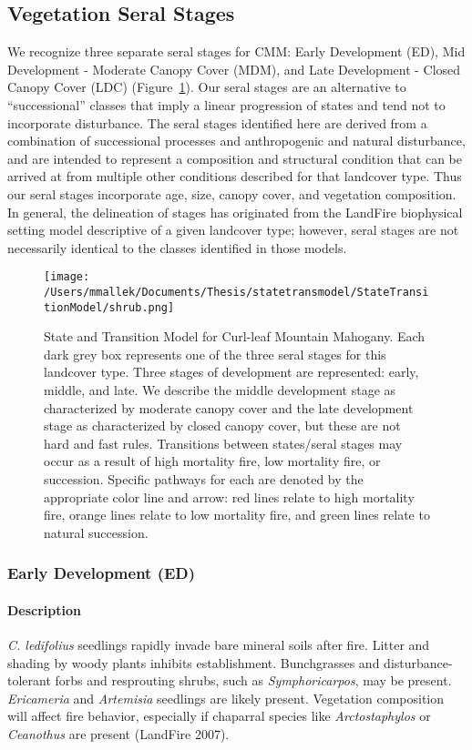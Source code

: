 \subsection*{Vegetation Seral Stages}
We recognize three separate seral stages for CMM: Early Development (ED), Mid Development - Moderate Canopy Cover (MDM), and Late Development - Closed Canopy Cover (LDC) (Figure~\ref{cmm_transmodel}). Our seral stages are an alternative to ``successional'' classes that imply a linear progression of states and tend not to incorporate disturbance. The seral stages identified here are derived from a combination of successional processes and anthropogenic and natural disturbance, and are intended to represent a composition and structural condition that can be arrived at from multiple other conditions described for that landcover type. Thus our seral stages incorporate age, size, canopy cover, and vegetation composition. In general, the delineation of stages has originated from the LandFire biophysical setting model descriptive of a given landcover type; however, seral stages are not necessarily identical to the classes identified in those models.

\begin{figure}[hbt]
\centering
\texttt{[image: /Users/mmallek/Documents/Thesis/statetransmodel/StateTransitionModel/shrub.png]}
\caption{State and Transition Model for Curl-leaf Mountain Mahogany. Each dark grey box represents one of the three seral stages for this landcover type. Three stages of development are represented: early, middle, and late. We describe the middle development stage as characterized by moderate canopy cover and the late development stage as characterized by closed canopy cover, but these are not hard and fast rules. Transitions between states/seral stages may occur as a result of high mortality fire, low mortality fire, or succession. Specific pathways for each are denoted by the appropriate color line and arrow: red lines relate to high mortality fire, orange lines relate to low mortality fire, and green lines relate to natural succession.} 
\label{cmm_transmodel}
\end{figure}

\subsubsection{Early Development (ED)}

\paragraph{Description} \emph{C. ledifolius} seedlings rapidly invade bare mineral soils after fire. Litter and shading by woody plants inhibits establishment. Bunchgrasses and disturbance-tolerant forbs and resprouting shrubs, such as \emph{Symphoricarpos}, may be present. \emph{Ericameria} and \emph{Artemisia} seedlings are likely present. Vegetation composition will affect fire behavior, especially if chaparral species like \emph{Arctostaphylos} or \emph{Ceanothus} are present (LandFire 2007).

